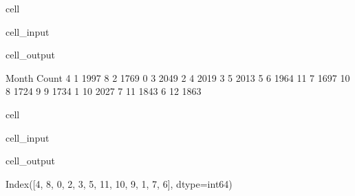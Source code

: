 \documentclass[letterpaper,10pt,english]{sphinxmanual}
\begin{document}
\begin{sphinxuseclass}{cell}
\begin{sphinxuseclass}{cell_input}
\begin{sphinxVerbatim}[commandchars=\\\{\}]
\end{sphinxVerbatim}

\end{sphinxuseclass}
\begin{sphinxuseclass}{cell_output}
\begin{sphinxVerbatim}[commandchars=\\\{\}]
    Month  Count
4       1   1997
8       2   1769
0       3   2049
2       4   2019
3       5   2013
5       6   1964
11      7   1697
10      8   1724
9       9   1734
1      10   2027
7      11   1843
6      12   1863
\end{sphinxVerbatim}

\end{sphinxuseclass}
\end{sphinxuseclass}
\begin{sphinxuseclass}{cell}
\begin{sphinxuseclass}{cell_input}
\begin{sphinxVerbatim}[commandchars=\\\{\}]
\end{sphinxVerbatim}

\end{sphinxuseclass}
\begin{sphinxuseclass}{cell_output}
\begin{sphinxVerbatim}[commandchars=\\\{\}]
Index([4, 8, 0, 2, 3, 5, 11, 10, 9, 1, 7, 6], dtype=\PYGZsq{}int64\PYGZsq{})
\end{sphinxVerbatim}

\end{sphinxuseclass}
\end{sphinxuseclass}
\end{document}
